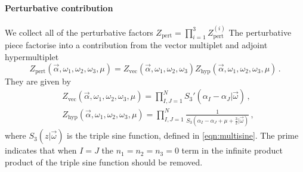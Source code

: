 \documentclass[main.tex]{subfiles}
\begin{document}
\paragraph{Perturbative contribution}
We collect all of the perturbative factors $Z_{\text{pert}}=\prod_{i=1}^3Z^{(i)}_{\text{pert}}$
The perturbative piece factorise into a contribution from the vector multiplet and adjoint hypermultiplet 
\begin{equation}\label{eqn:pertcont}
Z_{\text{pert}}\left(\vec{\alpha},\omega_1,\omega_2,\omega_3,\mu\right)=Z_{\text{vec}}\left(\vec{\alpha},\omega_1,\omega_2,\omega_3\right)Z_{\text{hyp}}\left(\vec{\alpha},\omega_1,\omega_2,\omega_3,\mu\right)\,.
\end{equation}
They are given by \cite{Kim:2012ava,Lockhart:2012vp,Kim:2012qf} 
\begin{align}
&Z_{\text{vec}}\left(\vec{\alpha},\omega_1,\omega_2,\omega_3,\mu\right)=\prod_{I,J=1}^NS_3'\left(\alpha_I-\alpha_J|\vec{\omega}\right)\,,\\ &Z_{\text{hyp}}\left(\vec{\alpha},\omega_1,\omega_2,\omega_3,\mu\right)=\prod_{I,J=1}^N\frac{1}{S_3\left(\alpha_I-\alpha_J+\mu+\frac{3}{2}|\vec{\omega}\right)}\,,
\end{align}
where $S_3(z|\vec{\omega})$ is the triple sine function, defined in \eqref{eqn:multisine}. The prime indicates that when $I=J$ the $n_1=n_2=n_3=0$ term in the infinite product product of the triple sine function should be removed.
\begin{comment}
\begin{equation}\label{eqn:pertcont}
Z_{\text{pert}}\left(\vec{\alpha},m,\epsilon_1,\epsilon_2,r\right)=Z_{\text{vec}}\left(\vec{\alpha},m,\epsilon_1,\epsilon_2,r\right)Z_{\text{hyp}}\left(\vec{\alpha},m,\epsilon_1,\epsilon_2,r\right)\,.
\end{equation}  
As in \cite{Bullimore:2014upa} we take the average over the charge conjugation with respect to \cite{Lockhart:2012vp} and therefore
\begin{align}
&Z_{\text{vec}}\left(\vec{\alpha},m,\epsilon_1,\epsilon_2,r\right)=\prod_{e\in\Delta}\tilde{\Gamma}_3'\left((e,\vec{\alpha})\right)^{-1/2}\tilde{\Gamma}_3\left((e,\vec{\alpha})+ 2\pi/r+2\epsilon_+\right)^{-1/2}\,,\label{eqn:pertvec}\\
&Z_{\text{hyp}}\left(\vec{\alpha},m,\epsilon_1,\epsilon_2,r\right)=\prod_{e\in\Delta}\tilde{\Gamma}_3\left((e,\vec{\alpha})+ m+\epsilon_+\right)^{1/2}\,,\label{eqn:perthyp}
\end{align}
where $\epsilon_{\pm}:=\frac{\epsilon_1\pm\epsilon_2}{2}$, $\Delta$ denotes the weights of the adjoint representation of $\mathfrak{g}$ and $\tilde{\Gamma}_3\left(z\right):=\Gamma_3\left(z|2\pi/r,\epsilon_1,\epsilon_2\right)\Gamma_3\left(1-z|2\pi/r,-\epsilon_1,-\epsilon_2\right)$ where $\Gamma_3$ denotes the triple Barnes Gamma function, defined in \eqref{eqn:multigamma}. The prime indicates regularisation required to deal with the Cartan zero modes $(e,\alpha)=0$ such that $\tilde\Gamma_3(0)=\lim_{z\to0}z\Gamma_3(z)$.
\end{comment}
\end{document}
